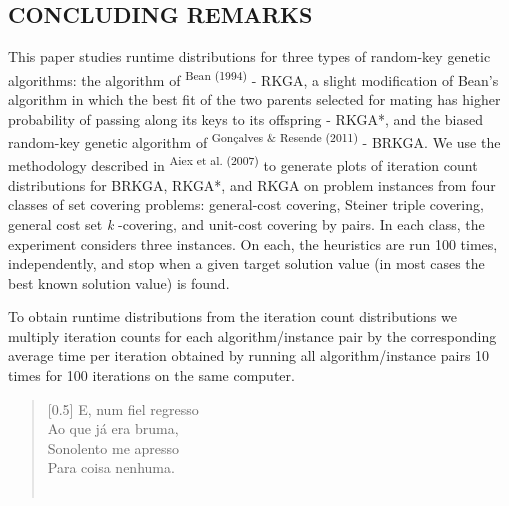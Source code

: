 \begin{multicols}{2}
\section*{CONCLUDING REMARKS}
\par{}This paper studies runtime distributions for three types of random-\allowbreak{}key genetic algorithms:\allowbreak{} the algorithm of \textsuperscript{Bean (\allowbreak{}1994)\allowbreak{}} -\allowbreak{} RKGA,\allowbreak{} a slight modification of Bean's algorithm in which the best fit of the two parents selected for mating has higher probability of passing along its keys to its offspring -\allowbreak{} RKGA*\allowbreak{},\allowbreak{} and the biased random-\allowbreak{}key genetic algorithm of \textsuperscript{Gonçalves \&\allowbreak{\allowbreak{}\allowbreak{}}\allowbreak{} Resende (\allowbreak{}2011)\allowbreak{}} -\allowbreak{} BRKGA.\allowbreak{} We use the methodology described in \textsuperscript{Aiex et al.\allowbreak{} (\allowbreak{}2007)\allowbreak{}} to generate plots of iteration count distributions for BRKGA,\allowbreak{} RKGA*\allowbreak{},\allowbreak{} and RKGA on problem instances from four classes of set covering problems:\allowbreak{} general-\allowbreak{}cost covering,\allowbreak{} Steiner triple covering,\allowbreak{} general cost set \textit{k} -\allowbreak{}covering,\allowbreak{} and unit-\allowbreak{}cost covering by pairs.\allowbreak{} In each class,\allowbreak{} the experiment considers three instances.\allowbreak{} On each,\allowbreak{} the heuristics are run 100 times,\allowbreak{} independently,\allowbreak{} and stop when a given target solution value (\allowbreak{}in most cases the best known solution value)\allowbreak{} is found.\allowbreak{}\par{}To obtain runtime distributions from the iteration count distributions we multiply iteration counts for each algorithm\fshyp{}instance pair by the corresponding average time per iteration obtained by running all algorithm\fshyp{}instance pairs 10 times for 100 iterations on the same computer.\allowbreak{}
\begin{verse}[0.5\textwidth]
E,\allowbreak{} num fiel regresso \\
Ao que já era bruma,\allowbreak{} \\
Sonolento me apresso \\
Para coisa nenhuma.\allowbreak{} \\
\hfill \\
\end{verse}

\end{multicols}
